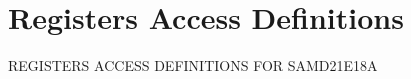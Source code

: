 \hypertarget{group___s_a_m_d21_e18_a__reg}{}\section{Registers Access Definitions}
\label{group___s_a_m_d21_e18_a__reg}
R\+E\+G\+I\+S\+T\+E\+RS A\+C\+C\+E\+SS D\+E\+F\+I\+N\+I\+T\+I\+O\+NS F\+OR S\+A\+M\+D21\+E18A 